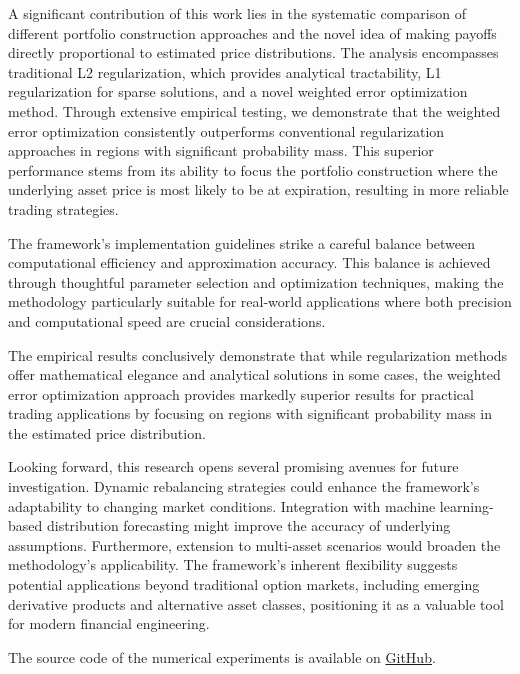 \documentclass[12pt]{article}
\begin{document}
A significant contribution of this work lies in the systematic comparison of different portfolio 
construction approaches and the novel idea of making payoffs directly proportional to estimated 
price distributions. The analysis encompasses traditional L2 regularization, which provides 
analytical tractability, L1 regularization for sparse solutions, and a novel weighted error 
optimization method. Through extensive empirical testing, we demonstrate that the weighted error 
optimization consistently outperforms conventional regularization approaches in regions with 
significant probability mass. This superior performance stems from its ability to focus the 
portfolio construction where the underlying asset price is most likely to be at expiration, 
resulting in more reliable trading strategies.

The framework's implementation guidelines strike a careful balance between computational efficiency 
and approximation accuracy. This balance is achieved through thoughtful parameter selection and 
optimization techniques, making the methodology particularly suitable for real-world applications 
where both precision and computational speed are crucial considerations.

The empirical results conclusively demonstrate that while regularization methods offer mathematical 
elegance and analytical solutions in some cases, the weighted error optimization approach provides 
markedly superior results for practical trading applications by focusing on regions with significant 
probability mass in the estimated price distribution.

Looking forward, this research opens several promising avenues for future investigation. Dynamic 
rebalancing strategies could enhance the framework's adaptability to changing market conditions. 
Integration with machine learning-based distribution forecasting might improve the accuracy of 
underlying assumptions. Furthermore, extension to multi-asset scenarios would broaden the 
methodology's applicability. The framework's inherent flexibility suggests potential applications 
beyond traditional option markets, including emerging derivative products and alternative asset 
classes, positioning it as a valuable tool for modern financial engineering.

The source code of the numerical experiments is available on \href{https://github.com/VladKochetov007/payoff_approximation}{GitHub}.



\end{document}
